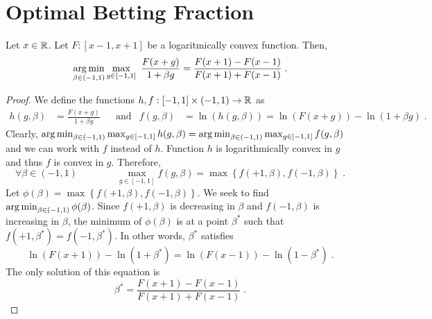 \section{Optimal Betting Fraction}
\label{section:optimal-betting-fraction}

\begin{theorem}
\label{theorem:optimal-betting-fraction}
Let $x \in \mathbb{R}$. Let $F:[x-1,x+1]$ be a logaritmically convex function. Then,
\[
\argmin_{\beta \in (-1,1)} \max_{g \in [-1,1]} \ \frac{F(x+g)}{1 + \beta g}
= \frac{F(x+1) - F(x-1)}{F(x+1) + F(x-1)} \; .
\]
\end{theorem}

\begin{proof}
We define the functions $h,f:[-1,1] \times (-1,1) \to \mathbb{R}$ as
\begin{align*}
h(g, \beta) & = \frac{F(x+g)}{1 + \beta g} &
& \text{and} &
f(g, \beta) & = \ln (h(g,\beta)) = \ln(F(x+g)) - \ln(1 + \beta g) \; .
\end{align*}
Clearly, $\operatorname*{arg\,min}_{\beta \in (-1,1)} \max_{g \in [-1,1]} h(g,\beta) = \operatorname*{arg\,min}_{\beta \in (-1,1)} \max_{g \in [-1,1]} f(g,\beta)$
and we can work with $f$ instead of $h$. Function $h$ is logarithmically convex
in $g$ and thus $f$ is convex in $g$. Therefore,
\[
\forall \beta \in (-1,1) \qquad \qquad
\max_{g \in [-1,1]} f(g,\beta) = \max \left\{ f(+1,\beta), f(-1,\beta) \right\} \; .
\]
Let $\phi(\beta) = \max \left\{ f(+1,\beta), f(-1,\beta) \right\}$. We seek to
find $\operatorname*{arg\,min}_{\beta \in (-1,1)} \phi(\beta)$. Since $f(+1,\beta)$ is decreasing
in $\beta$ and $f(-1,\beta)$ is increasing in $\beta$, the minimum of
$\phi(\beta)$ is at a point $\beta^*$ such that $f(+1,\beta^*) = f(-1,\beta^*)$.
In other words, $\beta^*$ satisfies
\[
\ln(F(x+1)) - \ln(1 + \beta^*) =  \ln(F(x-1)) - \ln(1 - \beta^*) \; .
\]
The only solution of this equation is
\[
\beta^* = \frac{F(x+1) - F(x-1)}{F(x+1) + F(x-1)} \; .
\]
\end{proof}

